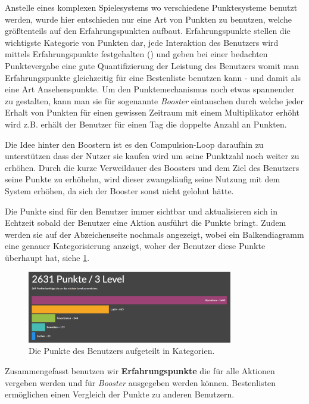 \documentclass[12pt,twoside]{book}
\begin{document}
Anstelle eines komplexen Spielesystems wo verschiedene Punktesysteme benutzt werden, wurde hier entschieden nur eine Art von Punkten zu benutzen, welche größtenteils auf den Erfahrungspunkten aufbaut. Erfahrungspunkte stellen die wichtigste Kategorie von Punkten dar, jede Interaktion des Benutzers wird mittels Erfahrungspunkte festgehalten (\citep{zichermann2011gamification, 38 - 39}) und geben bei einer bedachten Punktevergabe  eine gute Quantifizierung der Leistung des Benutzers womit man Erfahrungspunkte gleichzeitig für eine Bestenliste benutzen kann - und damit als eine Art Ansehenspunkte. Um den Punktemechanismus noch etwas spannender zu gestalten, kann man sie für sogenannte \textit{Booster} eintauschen durch welche jeder Erhalt von Punkten für einen gewissen Zeitraum mit einem Multiplikator erhöht wird z.B. erhält der Benutzer für einen Tag die doppelte Anzahl an Punkten.

Die Idee hinter den Boostern ist es den Compulsion-Loop daraufhin zu unterstützen dass der Nutzer sie kaufen wird um seine Punktzahl noch weiter zu erhöhen. Durch die kurze Verweildauer des Boosters und dem Ziel des Benutzers seine Punkte zu erhöhehn, wird dieser zwangsläufig seine Nutzung mit dem System erhöhen, da sich der Booster sonst nicht gelohnt hätte.

Die Punkte sind für den Benutzer immer sichtbar und aktualisieren sich in Echtzeit sobald der Benutzer eine Aktion ausführt die Punkte bringt. Zudem werden sie auf der Abzeichenseite nochmals angezeigt, wobei ein Balkendiagramm eine genauer Kategorisierung anzeigt, woher der Benutzer diese Punkte überhaupt hat, siehe \ref{fig:points}.

\begin{figure}[H]
    \centering
    \includegraphics[width=0.8\textwidth]{images/infoboard_userstats.png}
    \caption{Die Punkte des Benutzers aufgeteilt in Kategorien.}
    \label{fig:points}
\end{figure}

Zusammengefasst benutzen wir \textbf{Erfahrungspunkte} die für alle Aktionen vergeben werden und für \textit{Booster} ausgegeben werden können. Bestenlisten ermöglichen einen Vergleich der Punkte zu anderen Benutzern.
\end{document}

